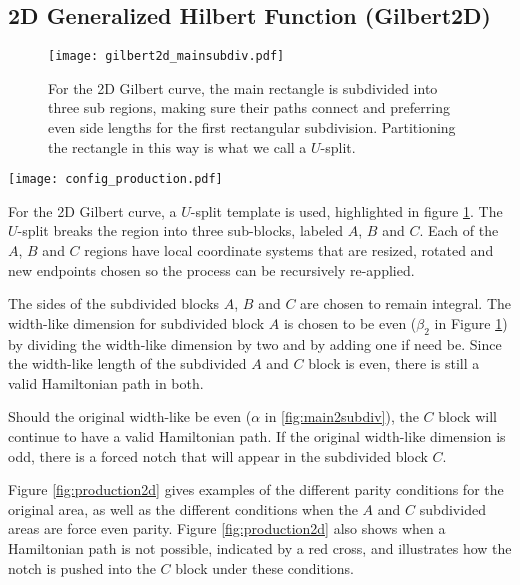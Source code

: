 \subsection{2D Generalized Hilbert Function (Gilbert2D)}

\begin{figure}[h]
  \centering
  \texttt{[image: gilbert2d\_mainsubdiv.pdf]}
  \caption{ For the 2D Gilbert curve, the main rectangle is subdivided into three sub regions, making sure their paths connect
            and preferring even side lengths for the first rectangular subdivision.
            Partitioning the rectangle in this way is what we call a $U$-split.  }
  \label{fig:main2dsubdiv}
\end{figure}


\begin{figure*}[ht]
  \centering
  \texttt{[image: config\_production.pdf]}
  \caption{ Enumeration of the subdivision template depending on different parities of $\alpha$ and $\beta$ dimensions. }
  \label{fig:production2d}
\end{figure*}

For the 2D Gilbert curve, a $U$-split template is used, highlighted in figure \ref{fig:main2dsubdiv}.
The $U$-split breaks the region into three sub-blocks, labeled $A$, $B$ and $C$.
Each of the $A$, $B$ and $C$ regions have local coordinate systems that are resized, rotated and
new endpoints chosen so the process can be recursively re-applied.

The sides of the subdivided blocks $A$, $B$ and $C$ are chosen to remain integral.
The width-like dimension for subdivided block $A$ is chosen to be even ($\beta_2$ in Figure \ref{fig:main2dsubdiv})
by dividing the width-like dimension by two and by adding one if need be.
Since the width-like length of the subdivided $A$ and $C$ block is even, there is still a valid Hamiltonian path 
in both.

Should the original width-like be even ($\alpha$ in \ref{fig:main2subdiv}), the $C$ block will continue to have 
a valid Hamiltonian path.
If the original width-like dimension is odd, there is a forced notch that will appear in the subdivided block $C$.

Figure \ref{fig:production2d} gives examples of the different parity conditions for the original area,
as well as the different conditions when the $A$ and $C$ subdivided areas are force even parity.
Figure \ref{fig:production2d} also shows when a Hamiltonian
path is not possible, indicated by a red cross, and illustrates how the notch is pushed into the $C$ block
under these conditions.

